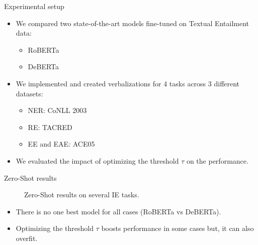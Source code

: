 \documentclass[
    11pt,
    notheorems,
    xcolor={dvipsnames},
    hyperref={
        pdfstartview=FitH, 
        pdftitle={Ikasketa-adibide urriko Informazio-Erauzketa}, 
        pdfauthor={Oscar Sainz Jimenez}, 
        citecolor=secondary, 
    }
]{beamer}
\begin{document}
\begin{frame}
    \begin{block}{Experimental setup}
        \begin{itemize}
            \item We compared two state-of-the-art models fine-tuned on Textual Entailment data:
                  \begin{itemize}
                      \item RoBERTa~\citep{liu2019roberta}
                      \item DeBERTa~\citep{he2021deberta}
                  \end{itemize}
            \item We implemented and created verbalizations for 4 tasks across 3 different datasets:
                  \begin{itemize}
                      \item NER: CoNLL 2003~\citep{tjong-kim-sang-de-meulder-2003-introduction}
                      \item RE: TACRED~\citep{zhang2017tacred}
                      \item EE and EAE: ACE05~\citep{ACE}
                  \end{itemize}
            \item We evaluated the impact of optimizing the threshold $\tau$ on the performance.
        \end{itemize}
    \end{block}
\end{frame}

\begin{frame}
    \begin{block}{Zero-Shot results}

        \begin{figure}
            \centering
            \resizebox{.92\textwidth}{!}{
                
            }
            \caption{Zero-Shot results on several IE tasks.}
        \end{figure}

        \begin{itemize}
            \item There is no one best model for all cases (RoBERTa vs DeBERTa).
            \item Optimizing the threshold $\tau$ boosts performance in some cases but, it can also overfit.
        \end{itemize}

    \end{block}

\end{frame}
\end{document}
